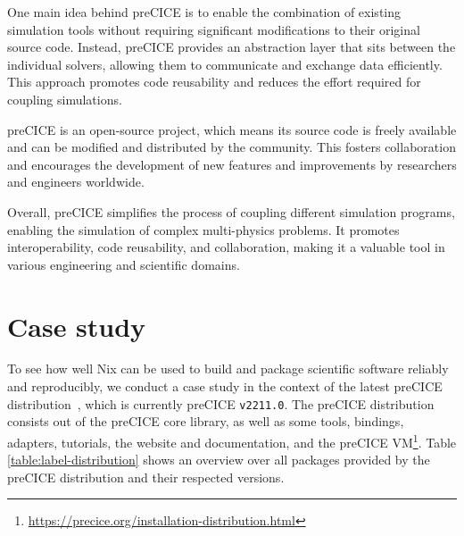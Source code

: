 \documentclass{eceasst}
\begin{document}
One main idea behind preCICE is to enable the combination of existing simulation tools without requiring significant modifications to their original source code.
Instead, preCICE provides an abstraction layer that sits between the individual solvers, allowing them to communicate and exchange data efficiently.
This approach promotes code reusability and reduces the effort required for coupling simulations.

preCICE is an open-source project, which means its source code is freely available and can be modified and distributed by the community.
This fosters collaboration and encourages the development of new features and improvements by researchers and engineers worldwide.

Overall, preCICE simplifies the process of coupling different simulation programs, enabling the simulation of complex multi-physics problems.
It promotes interoperability, code reusability, and collaboration, making it a valuable tool in various engineering and scientific domains.

\section{Case study}

To see how well Nix can be used to build and package scientific software reliably and reproducibly, we conduct a case study in the context of the latest preCICE distribution~\cite{preciceDistribution}, which is currently preCICE \texttt{v2211.0}.
The preCICE distribution consists out of the preCICE core library, as well as some tools, bindings, adapters, tutorials, the website and documentation, and the preCICE VM\footnote{\url{https://precice.org/installation-distribution.html}}.
Table \ref{table:label-distribution} shows an overview over all packages provided by the preCICE distribution and their respected versions.
\end{document}

